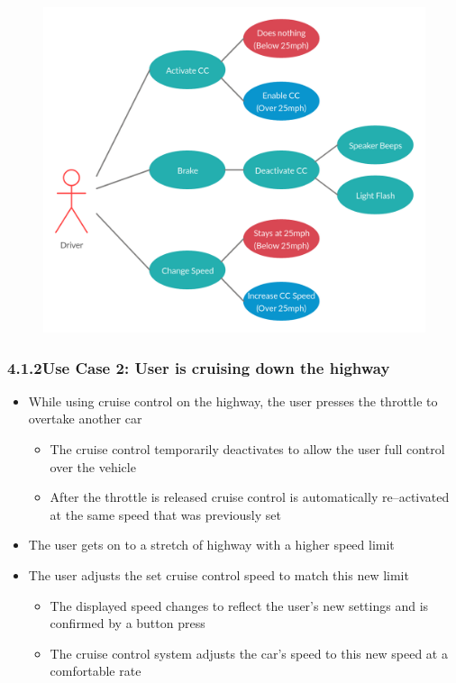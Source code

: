 \documentclass{article}
\begin{document}
	\begin{figure}[!htb]
		\centering
		\includegraphics[scale=0.184]{UseCase1}
	\end{figure}
	\newpage
	\subsubsection*{4.1.2\quad Use Case 2: User is cruising down the highway}
	\begin{itemize}
		\item While using cruise control on the highway, the user presses the throttle to overtake another car
		\begin{itemize}
			\item The cruise control temporarily deactivates to allow the user full control over the vehicle
			\item After the throttle is released cruise control is automatically re--activated at the same speed that was previously set
		\end{itemize}
		\item The user gets on to a stretch of highway with a higher speed limit
		\item The user adjusts the set cruise control speed to match this new limit
		\begin{itemize}
			\item The displayed speed changes to reflect the user's new settings and is confirmed by a button press
			\item The cruise control system adjusts the car's speed to this new speed at a comfortable rate
		\end{itemize}
	\end{itemize}
	
\end{document}
